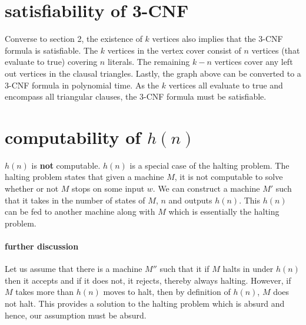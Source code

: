 \documentclass[11pt,letterpaper]{article}
\begin{document}
\section{satisfiability of 3-CNF}
Converse to section 2, the existence of $k$ vertices also implies that the 3-CNF formula is satisfiable. The $k$ vertices in the vertex cover consist of $n$ vertices (that evaluate to true) covering $n$ literals. The remaining $k-n$ vertices cover any left out vertices in the clausal triangles. Lastly, the graph above can be converted to a 3-CNF formula in polynomial time. As the $k$ vertices all evaluate to true and encompass all triangular clauses, the 3-CNF formula must be satisfiable.


\section{computability of $h(n)$}
$h(n)$ is \textbf{not} computable. $h(n)$ is a special case of the halting problem. The halting problem states that given a machine $M$, it is not computable to solve whether or not $M$ stops on some input $w$. We can construct a machine $M'$ such that it takes in the number of states of $M$, $n$ and outputs $h(n)$. This $h(n)$ can be fed to another machine along with $M$ which is essentially the halting problem.
\paragraph{further discussion}
Let us assume that there is a machine $M''$ such that it if $M$ halts in under $h(n)$ then it accepts and if it does not, it rejects, thereby always halting. However, if $M$ takes more than $h(n)$ moves to halt, then by definition of $h(n)$, $M$ does not halt. This provides a solution to the halting problem which is absurd and hence, our assumption must be absurd.
\end{document}

